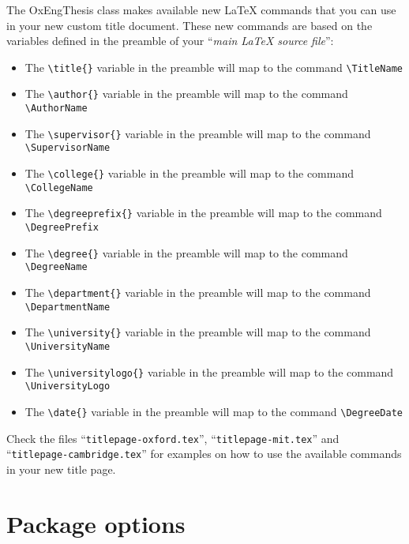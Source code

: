 The OxEngThesis class makes available new LaTeX commands that you can use in your new custom title document. These new commands are based on the variables defined in the preamble of your ``\textit{main LaTeX source file}'':


\begin{itemize}

    \item The \verb|\title{}| variable in the preamble will map to the command \verb|\TitleName|

    \item The \verb|\author{}| variable in the preamble will map to the command \verb|\AuthorName|

    \item The \verb|\supervisor{}| variable in the preamble will map to the command \verb|\SupervisorName|

    \item The \verb|\college{}| variable in the preamble will map to the command \verb|\CollegeName|

    \item The \verb|\degreeprefix{}| variable in the preamble will map to the command \verb|\DegreePrefix|

    \item The \verb|\degree{}| variable in the preamble will map to the command \verb|\DegreeName|

    \item The \verb|\department{}| variable in the preamble will map to the command \verb|\DepartmentName|

    \item The \verb|\university{}| variable in the preamble will map to the command \verb|\UniversityName|

    \item The \verb|\universitylogo{}| variable in the preamble will map to the command \verb|\UniversityLogo|

    \item The \verb|\date{}| variable in the preamble will map to the command \verb|\DegreeDate|

\end{itemize}


Check the files ``\verb|titlepage-oxford.tex|'', ``\verb|titlepage-mit.tex|'' and ``\verb|titlepage-cambridge.tex|'' for examples on how to use the available commands in your new title page.


\section{Package options}


